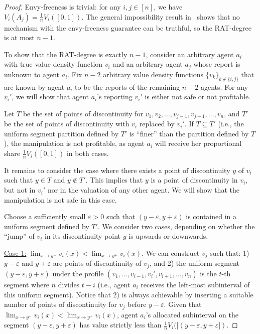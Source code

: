 \begin{proof}
    Envy-freeness is trivial: for any $i,j\in[n]$, we have $V_i(A_j)=\frac1nV_i([0,1])$.
    The general impossibility result in~\citet{tao2022existence} shows that no mechanism with the envy-freeness guarantee can be truthful, so the RAT-degree is at most $n-1$.

    To show that the RAT-degree is exactly $n-1$, consider an arbitrary agent $a_i$ with true value density function $v_i$ and an arbitrary agent $a_j$ whose report is unknown to agent $a_i$.
    Fix $n-2$ arbitrary value density functions $\{v_k\}_{k\notin\{i,j\}}$ that are known by agent $a_i$ to be the reports of the remaining $n-2$ agents.
    For any $v_i'$, we will show that agent $a_i$'s reporting $v_i'$ is either not safe or not profitable.

    Let $T$ be the set of points of discontinuity for $v_1,v_2,\ldots,v_{j-1},v_{j+1},\ldots,v_n$, and $T'$ be the set of points of discontinuity with $v_i$ replaced by $v_i'$.
    If $T\subseteq T'$ (i.e., the uniform segment partition defined by $T'$ is ``finer'' than the partition defined by $T$), the manipulation is not profitable, as agent $a_i$ will receive her proportional share $\frac1nV_i([0,1])$ in both cases.
    
    It remains to consider the case where there exists a point of discontinuity $y$ of $v_i$ such that $y\in T$ and $y\notin T'$.
    This implies that $y$ is a point of discontinuity in $v_i$, but not in $v_i'$ nor in the valuation of any other agent.
    We will show that the manipulation is not safe in this case.

    Choose a sufficiently small $\varepsilon>0$ such that $(y-\varepsilon, y+\varepsilon)$ is contained in a uniform segment defined by $T'$.
    We consider two cases, depending on whether the ``jump'' of $v_i$ in its discontinuity point $y$ is upwards or downwards.
    
    \underline{Case 1:}  $\lim_{x\to y^-}v_i(x)<\lim_{x\to y^+}v_i(x)$.
    We can construct $v_j$ such that: 1) $y-\varepsilon$ and $y+\varepsilon$ are points of discontinuity of $v_j$, and 2) the uniform segment $(y-\varepsilon, y+\varepsilon)$ under the profile $(v_1,\ldots,v_{i-1},v_i',v_{i+1},\ldots,v_n)$ is the $t$-th segment where $n$ divides $t-i$ (i.e., agent $a_i$ receives the left-most subinterval of this uniform segment).
    Notice that 2) is always achievable by inserting a suitable number of points of discontinuity for $v_j$ before $y-\varepsilon$.
    Given that $\lim_{x\to y^-}v_i(x)<\lim_{x\to y^+}v_i(x)$, agent $a_i$'s allocated subinterval on the segment $(y-\varepsilon, y+\varepsilon)$ has value strictly less than $\frac1nV_i([(y-\varepsilon, y+\varepsilon])$.


\end{proof}
